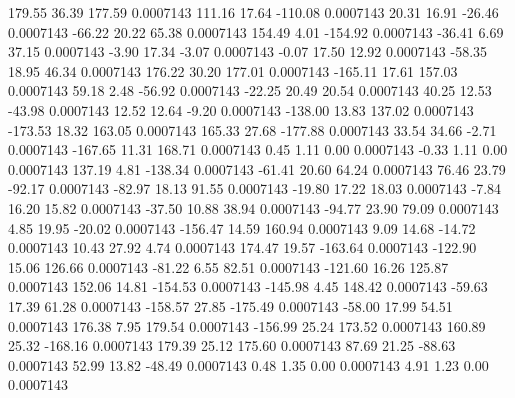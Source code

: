       179.55       36.39      177.59     0.0007143
      111.16       17.64     -110.08     0.0007143
       20.31       16.91      -26.46     0.0007143
      -66.22       20.22       65.38     0.0007143
      154.49        4.01     -154.92     0.0007143
      -36.41        6.69       37.15     0.0007143
       -3.90       17.34       -3.07     0.0007143
       -0.07       17.50       12.92     0.0007143
      -58.35       18.95       46.34     0.0007143
      176.22       30.20      177.01     0.0007143
     -165.11       17.61      157.03     0.0007143
       59.18        2.48      -56.92     0.0007143
      -22.25       20.49       20.54     0.0007143
       40.25       12.53      -43.98     0.0007143
       12.52       12.64       -9.20     0.0007143
     -138.00       13.83      137.02     0.0007143
     -173.53       18.32      163.05     0.0007143
      165.33       27.68     -177.88     0.0007143
       33.54       34.66       -2.71     0.0007143
     -167.65       11.31      168.71     0.0007143
        0.45        1.11        0.00     0.0007143
       -0.33        1.11        0.00     0.0007143
      137.19        4.81     -138.34     0.0007143
      -61.41       20.60       64.24     0.0007143
       76.46       23.79      -92.17     0.0007143
      -82.97       18.13       91.55     0.0007143
      -19.80       17.22       18.03     0.0007143
       -7.84       16.20       15.82     0.0007143
      -37.50       10.88       38.94     0.0007143
      -94.77       23.90       79.09     0.0007143
        4.85       19.95      -20.02     0.0007143
     -156.47       14.59      160.94     0.0007143
        9.09       14.68      -14.72     0.0007143
       10.43       27.92        4.74     0.0007143
      174.47       19.57     -163.64     0.0007143
     -122.90       15.06      126.66     0.0007143
      -81.22        6.55       82.51     0.0007143
     -121.60       16.26      125.87     0.0007143
      152.06       14.81     -154.53     0.0007143
     -145.98        4.45      148.42     0.0007143
      -59.63       17.39       61.28     0.0007143
     -158.57       27.85     -175.49     0.0007143
      -58.00       17.99       54.51     0.0007143
      176.38        7.95      179.54     0.0007143
     -156.99       25.24      173.52     0.0007143
      160.89       25.32     -168.16     0.0007143
      179.39       25.12      175.60     0.0007143
       87.69       21.25      -88.63     0.0007143
       52.99       13.82      -48.49     0.0007143
        0.48        1.35        0.00     0.0007143
        4.91        1.23        0.00     0.0007143
